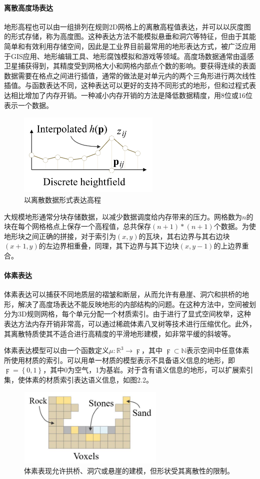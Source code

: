 \paragraph{离散高度场表达}地形高程也可以由一组排列在规则2D网格上的离散高程值表达，并可以以灰度图的形式存储，称为高度图。这种表达方法不能模拟悬垂和洞穴等特征，但由于其能简单和有效利用存储空间，因此是工业界目前最常用的地形表达方式，被广泛应用于GIS应用、地形编辑工具、地形腐蚀模拟和游戏等领域。高度场数据通常由遥感卫星捕获得到，其精度受到网格大小和网格内部点个数的影响。要获得连续的表面数据需要在格点之间进行插值，通常的做法是对单元内的两个三角形进行两次线性插值。与函数表达不同，这种表达可以更好的支持不同形式的地形，但和过程式表达相比增加了内存开销。一种减小内存开销的方法是降低数据精度，用8位或16位表示一个数据。
\begin{figure}[htbp]
\centering
\includegraphics[height=4cm,width=6.8cm]{figures/discrete.PNG}
\caption{以离散数据形式表达高程\supercite{eric-review}}
\end{figure}
大规模地形通常分块存储数据，以减少数据调度给内存带来的压力。网格数为$n$的块在每个网格格点上保存一个高程值，总共保存$(n+1)*(n+1)$个数据。为使地形块之间正确的拼接，对于索引为$(x,y)$的瓦块，其右边界与其右边块$(x+1,y)$的左边界相重叠，同理，其下边界与其下边块$(x,y-1)$的上边界重合。

\paragraph{体素表达}
体素表达可以捕获不同地质层的褶皱和断层，从而允许有悬崖、洞穴和拱桥的地形，解决了高度场表达不能反映地形的内部结构的问题。在这种方法中，空间被划分为3D规则网格，每个单元分配一个材质索引。由于进行了显式空间枚举，这种表达方法内存开销非常高，可以通过稀疏体素八叉树等技术进行压缩优化。此外，其离散特质使其不适合进行高精度的平滑地形建模，如非常平缓的斜坡等。\par
体素表达模型可以由一个函数定义$\mu:\mathbb{R}^3\to \digamma$，其中 $\digamma\subset\mathbb{N}$表示空间中任意体素所使用材质的索引。可以用单一材质的模型表示不具备语义信息的地形，即$\digamma=\left\{0,1\right\}$，其中0为空气，1为基岩。对于含有语义信息的地形，可以扩展索引集，使体素的材质索引表达语义信息，如图2.2。
\begin{figure}[htbp]
\centering
\includegraphics[height=3.8cm,width=7cm]{figures/voxel.JPG}
\caption{体素表现允许拱桥、洞穴或悬崖的建模，但形状受其离散性的限制。\supercite{eric-review}}
\end{figure}

